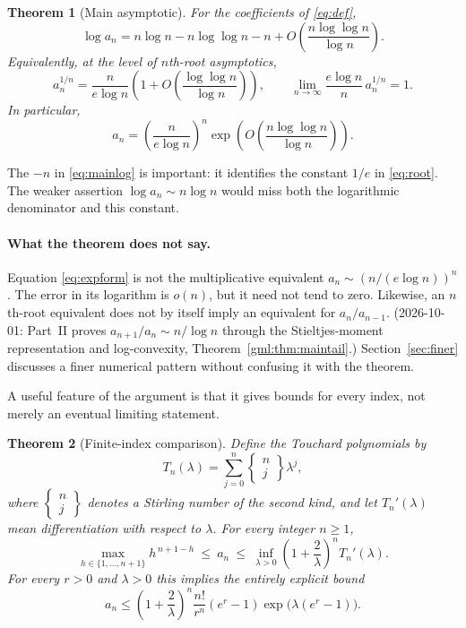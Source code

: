 \documentclass[11pt]{article}
\numberwithin{equation}{section}
\newtheorem{theorem}{Theorem}[section]
\theoremstyle{definition}
\theoremstyle{remark}
\newcommand{\ST}[2]{\left\{\begin{matrix}#1\\#2\end{matrix}\right\}}
\begin{document}
\begin{theorem}[Main asymptotic]\label{thm:main}
For the coefficients of \eqref{eq:def},
\begin{equation}\label{eq:mainlog}
 \log a_n=n\log n-n\log\log n-n
       +O\!\left(\frac{n\log\log n}{\log n}\right).
\end{equation}
Equivalently, at the level of $n$th-root asymptotics,
\begin{equation}\label{eq:root}
 \boxed{\displaystyle
 a_n^{1/n}=\frac{n}{e\log n}
       \left(1+O\!\left(\frac{\log\log n}{\log n}\right)\right),
 \qquad
 \lim_{n\to\infty}\frac{e\log n}{n}\,a_n^{1/n}=1.}
\end{equation}
In particular,
\begin{equation}\label{eq:expform}
 a_n=\left(\frac{n}{e\log n}\right)^n
        \exp\!\left(O\!\left(\frac{n\log\log n}{\log n}\right)\right).
\end{equation}
\end{theorem}

The $-n$ in \eqref{eq:mainlog} is important: it identifies the constant
$1/e$ in \eqref{eq:root}. The weaker assertion $\log a_n\sim n\log n$
would miss both the logarithmic denominator and this constant.

\paragraph{What the theorem does not say.}
Equation \eqref{eq:expform} is not the multiplicative equivalent
$a_n\sim(n/(e\log n))^n$. The error in its logarithm is $o(n)$, but it
need not tend to zero. Likewise, an $n$th-root equivalent does not by
itself imply an equivalent for $a_n/a_{n-1}$. (2026-10-01: Part~II proves
$a_{n+1}/a_n\sim n/\log n$ through the Stieltjes-moment representation
and log-convexity, Theorem~\ref{gml:thm:maintail}.) Section~\ref{sec:finer}
discusses a finer numerical pattern without confusing it with the theorem.

A useful feature of the argument is that it gives bounds for every index,
not merely an eventual limiting statement.

\begin{theorem}[Finite-index comparison]\label{thm:finite}
Define the Touchard polynomials by
\begin{equation}\label{eq:touchard}
 T_n(\lambda)=\sum_{j=0}^n\ST{n}{j}\lambda^j,
\end{equation}
where $\ST{n}{j}$ denotes a Stirling number of the second kind, and let
$T_n'(\lambda)$ mean differentiation with respect to $\lambda$.
For every integer $n\ge1$,
\begin{equation}\label{eq:finite}
 \boxed{\displaystyle
 \max_{h\in\{1,\ldots,n+1\}}h^{\,n+1-h}
 \ \le\ a_n\ \le\
 \inf_{\lambda>0}\left(1+\frac2\lambda\right)^nT_n'(\lambda).}
\end{equation}
For every $r>0$ and $\lambda>0$ this implies the entirely explicit bound
\begin{equation}\label{eq:cauchyupper}
 a_n\le
 \left(1+\frac2\lambda\right)^n
 \frac{n!}{r^n}(e^r-1)\exp\!\bigl(\lambda(e^r-1)\bigr).
\end{equation}
\end{theorem}
\end{document}
